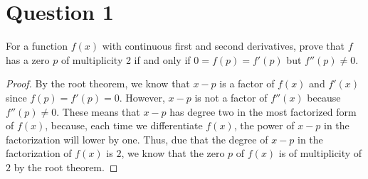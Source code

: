 \section{Question 1}

\begin{question}
    For a function $f(x)$ with continuous first and second derivatives, prove that $f$ has a zero $p$ of multiplicity 2 if and only if $0 = f(p) = f'(p)$ but $f''(p) \neq 0$.
\end{question}

\begin{answer}
    \begin{proof}
        By the root theorem, we know that $x - p$ is a factor of $f(x)$ and $f'(x)$ since $f(p) = f'(p) = 0$. However, $x - p$ is not a factor of $f''(x)$ because $f''(p) \neq 0$. These means that $x - p$ has degree two in the most factorized form of $f(x)$, because, each time we differentiate $f(x)$, the power of $x - p$ in the factorization will lower by one. Thus, due that the degree of $x - p$ in the factorization of $f(x)$ is $2$, we know that the zero $p$ of $f(x)$ is of multiplicity of $2$ by the root theorem.
    \end{proof}
\end{answer}